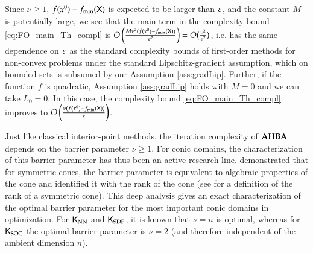 \begin{remark}
\label{rem:FO_complexity_simplified}
Since $\nu \geq 1$, $f(x^{0}) - f_{\min}(\mathsf{X})$ is expected to be larger than $\varepsilon$, and the constant $M$ is potentially large, we see that the main term in the complexity bound \eqref{eq:FO_main_Th_compl} is $O\left(\frac{M\nu^2(f(x^{0}) - f_{\min}(\mathsf{X}))}{\varepsilon^2}\right)=O(\frac{\nu^{2}}{\varepsilon^{2}})$, i.e. has the same dependence on $\varepsilon$ as the standard complexity bounds  \cite{CarDucHinSid19b,CarDucHinSid19,lan2020first} of first-order methods for non-convex problems under the standard Lipschitz-gradient assumption, which on bounded sets is subsumed by our Assumption \ref{ass:gradLip}. Further, if the function $f$ is quadratic, Assumption \ref{ass:gradLip} holds with $M=0$ and we can take $L_0=0$. In this case, the complexity bound \eqref{eq:FO_main_Th_compl} improves to $O\left(\frac{\nu(f(x^{0}) - f_{\min}(\mathsf{X}))}{\varepsilon}\right)$. 

Just like classical interior-point methods, the iteration complexity of $\operatorname{\mathbf{AHBA}}$ depends on the barrier parameter $\nu\geq 1$. For conic domains, the characterization of this barrier parameter has thus been an active research line. \cite{GulTun98} demonstrated that for symmetric cones, the barrier parameter is equivalent to algebraic properties of the cone and identified it with the rank of the cone (see \cite{FarKor94} for a definition of the rank of a symmetric cone). This deep analysis gives an exact characterization of the optimal barrier parameter for the most important conic domains in optimization. For $\mathsf{K}_{\text{NN}}$ and $\mathsf{K}_{\text{SDP}}$, it is known that $\nu=n$ is optimal, whereas for $\mathsf{K}_{\text{SOC}}$ the optimal barrier parameter is $\nu=2$ (and therefore independent of the ambient dimension $n$). 
\close
\end{remark}
